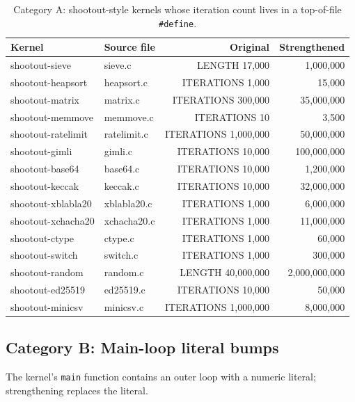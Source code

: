 \begin{table}[h]
\centering
\small
\begin{tabular}{l l r r}
\toprule
Kernel & Source file & Original & Strengthened \\
\midrule
shootout-sieve     & sieve.c     & LENGTH 17{,}000        & 1{,}000{,}000 \\
shootout-heapsort  & heapsort.c  & ITERATIONS 1{,}000     & 15{,}000 \\
shootout-matrix    & matrix.c    & ITERATIONS 300{,}000   & 35{,}000{,}000 \\
shootout-memmove   & memmove.c   & ITERATIONS 10          & 3{,}500 \\
shootout-ratelimit & ratelimit.c & ITERATIONS 1{,}000{,}000 & 50{,}000{,}000 \\
shootout-gimli     & gimli.c     & ITERATIONS 10{,}000    & 100{,}000{,}000 \\
shootout-base64    & base64.c    & ITERATIONS 10{,}000    & 1{,}200{,}000 \\
shootout-keccak    & keccak.c    & ITERATIONS 10{,}000    & 32{,}000{,}000 \\
shootout-xblabla20 & xblabla20.c & ITERATIONS 1{,}000     & 6{,}000{,}000 \\
shootout-xchacha20 & xchacha20.c & ITERATIONS 1{,}000     & 11{,}000{,}000 \\
shootout-ctype     & ctype.c     & ITERATIONS 1{,}000     & 60{,}000 \\
shootout-switch    & switch.c    & ITERATIONS 1{,}000     & 300{,}000 \\
shootout-random    & random.c    & LENGTH 40{,}000{,}000  & 2{,}000{,}000{,}000 \\
shootout-ed25519   & ed25519.c   & ITERATIONS 10{,}000    & 50{,}000 \\
shootout-minicsv   & minicsv.c   & ITERATIONS 1{,}000{,}000 & 8{,}000{,}000 \\
\bottomrule
\end{tabular}
\caption{Category A: shootout-style kernels whose iteration count lives in a top-of-file \texttt{\#define}.}
\end{table}

\subsection{Category B: Main-loop literal bumps}

The kernel's \texttt{main} function contains an outer loop with a numeric literal; strengthening replaces the literal.

